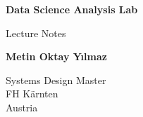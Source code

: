 \begin{titlepage}
	\begin{center}
		\vspace*{1cm}

		\textbf{\Large Data Science Analysis Lab}

		\vspace{0.5cm}
		\large Lecture Notes

		\vspace{1.5cm}

		\textbf{Metin Oktay Yılmaz}

		\vspace{15cm}


		Systems Design Master\\
		FH K\"arnten\\
		Austria\\
	\end{center}
\end{titlepage}